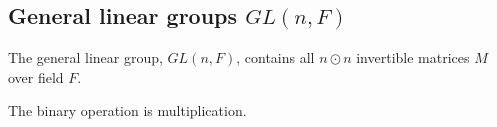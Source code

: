 
\subsection{General linear groups \(GL(n, F)\)}

The general linear group, \(GL(n, F)\), contains all \(n\odot n\) invertible matrices \(M\) over field \(F\).

The binary operation is multiplication.

